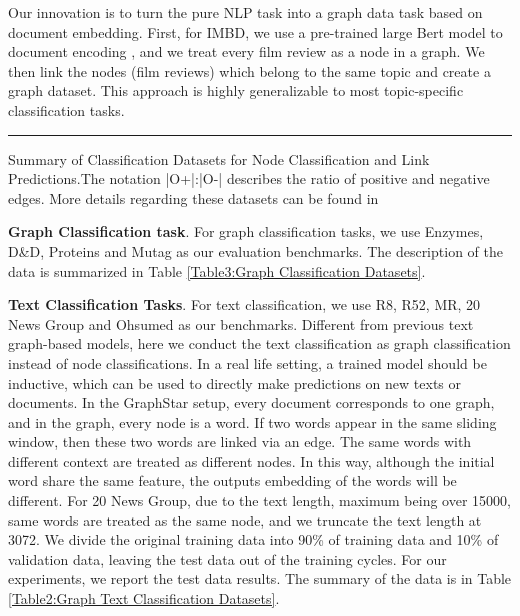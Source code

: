 \documentclass{article}
\begin{document}
Our innovation is to turn the pure NLP task into a graph data task based on document embedding. First, for IMBD, we use a pre-trained large Bert model to document encoding \cite{devlin2018bert}, and we treat every film review as a node in a graph. We then link the nodes (film reviews) which belong to the same topic and create a graph dataset. This approach is highly generalizable to most topic-specific classification tasks. 

\begin{table}[!ht]
\centering
{}
\rule{\linewidth}{0cm}

\caption{\label{Summary of Classification Datasets for Node Classification and Link Predictions} Summary of Classification Datasets for Node Classification and Link Predictions.The notation |O+|:|O-| describes the ratio of positive and negative edges. More details regarding these datasets can be found in \cite{sen2008collective, wang2016structural}}
\end{table}

\textbf{Graph Classification task}. For graph classification tasks, we use Enzymes, D\&D, Proteins and Mutag as our evaluation benchmarks. The description of the data is summarized in Table \ref{Table3:Graph Classification Datasets}.

\textbf{Text Classification Tasks}. For text classification, we use R8, R52, MR, 20 News Group and Ohsumed as our benchmarks.
Different from previous text graph-based models\cite{DBLP:journals/corr/abs-1902-07153, yao2018graph}, here we conduct the text classification as graph classification instead of node classifications. In a real life setting, a trained model should be inductive, which can be used to directly make predictions on new texts or documents. In the GraphStar setup, every document corresponds to one graph, and in the graph, every node is a word. If two words appear in the same sliding window, then these two words are linked via an edge. The same words with different context are treated as different nodes. In this way, although the initial word share the same feature, the outputs embedding of the words will be different. For 20 News Group, due to the text length, maximum being over 15000, same words are treated as the same node, and we truncate the text length at 3072. We divide the original training data into 90\% of training data and 10\% of validation data, leaving the test data out of the training cycles. For our experiments, we report the test data results. The summary of the data is in Table \ref{Table2:Graph Text Classification Datasets}.
\end{document}
